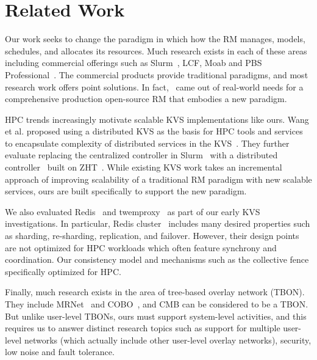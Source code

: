 \section{Related Work}
Our work seeks to change the paradigm in which 
how the RM manages, models, schedules, and
allocates its resources. Much research exists in
each of these areas including commercial offerings
such as Slurm~\cite{Jette02slurm}, LCF, 
Moab and PBS Professional~\cite{PSBPro}.
The commercial products provide traditional paradigms, and
most research work offers 
point solutions. In fact, \flux\ came out of real-world needs 
for a comprehensive production open-source RM that embodies a new paradigm. 

HPC trends increasingly motivate scalable KVS implementations 
like ours. Wang et al. proposed using a distributed KVS 
as the basis for HPC tools and services to encapsulate
complexity of distributed services in the KVS~\cite{Wang:2013:USE:2503210.2503239}.
%
They further evaluate replacing the centralized controller in
Slurm~\cite{Jette02slurm} with a distributed controller~\cite{Slurmpp}
built on ZHT~\cite{Li:2013:ZLR:2510661.2511401}.
While existing KVS work takes an incremental approach of improving 
scalability of a traditional RM paradigm with new scalable services,
ours are built specifically to support the new paradigm. 

We also evaluated Redis~\cite{Redis} and twemproxy~\cite{Twemproxy}
as part of our early KVS investigations.
In particular, Redis cluster~\cite{RedisClusterTut,RedisClusterSpec} 
includes many desired properties such as 
sharding, re-sharding, replication, and failover.
However, their design points are not optimized
for HPC workloads which often feature synchrony and coordination. 
Our consistency model and mechanisms such as the collective fence 
specifically optimized for HPC.


%
Finally, much research exists in the area of tree-based overlay network (TBON). 
They include MRNet~\cite{mrnet} and COBO~\cite{launchmon}, and 
CMB can be considered to be a TBON. But unlike user-level
TBONs, ours must support system-level activities, and this 
requires us to answer distinct research topics
such as support for multiple user-level networks (which actually
include other user-level overlay networks), security, low noise 
and fault tolerance. 


